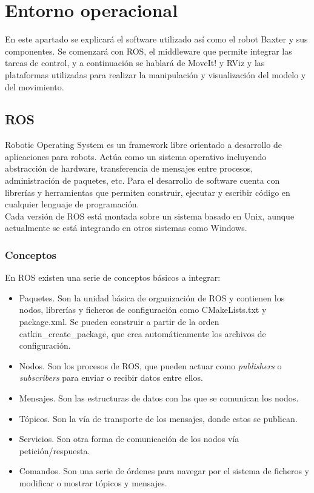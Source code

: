 \newpage
\section{Entorno operacional}

\noindent En este apartado se explicará el software utilizado así como el robot Baxter y sus componentes. Se comenzará con ROS, el middleware que permite integrar las tareas de control, y a continuación se hablará de MoveIt! y RViz y las plataformas utilizadas para realizar la manipulación y visualización del modelo y del movimiento. \\

\subsection{ROS}

\noindent Robotic Operating System \cite{ROS} \cite{ROS2} es un framework libre orientado a desarrollo de aplicaciones para robots. Actúa como un sistema operativo incluyendo abstracción de hardware, transferencia de mensajes entre procesos, administración de paquetes, etc. Para el desarrollo de software cuenta con librerías y herramientas que permiten construir, ejecutar y escribir código en cualquier lenguaje de programación. \\
\noindent Cada versión de ROS está montada sobre un sistema basado en Unix, aunque actualmente se está integrando en otros sistemas como Windows. \\


\subsubsection{Conceptos}
\noindent En ROS existen una serie de conceptos básicos a integrar:

\begin{itemize}
	\item Paquetes. Son la unidad básica de organización de ROS y contienen los nodos, librerías y ficheros de configuración como CMakeLists.txt y package.xml. Se pueden construir a partir de la orden catkin\_create\_package, que crea automáticamente los archivos de configuración.
	\item Nodos. Son los procesos de ROS, que pueden actuar como \textit{publishers} o \textit{subscribers} para enviar o recibir datos entre ellos.
	\item Mensajes. Son las estructuras de datos con las que se comunican los nodos.
	\item Tópicos. Son la vía de transporte de los mensajes, donde estos se publican.
	\item Servicios. Son otra forma de comunicación de los nodos vía petición/respuesta. 
	\item Comandos. Son una serie de órdenes para navegar por el sistema de ficheros y modificar o mostrar tópicos y mensajes. \\
\end{itemize}



